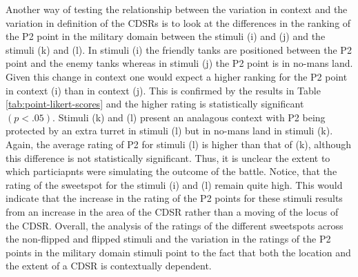 \documentclass[11pt,letterpaper]{article}
\begin{document}

Another way of testing the relationship between the variation in context and the variation in definition of the CDSRs is to look at the differences in the ranking of the P2 point in the military domain between the stimuli (i) and (j) and the stimuli (k) and (l). In stimuli (i) the friendly tanks are positioned between the P2 point and the enemy tanks whereas in stimuli (j) the P2 point is in no-mans land. Given this change in context one would expect a higher ranking for the P2 point in context (i) than in context (j). This is confirmed by the results in Table \ref{tab:point-likert-scores} and the higher rating is statistically significant $(p<.05)$. Stimuli (k) and (l) present an analagous context with P2 being protected by an extra turret in stimuli (l) but in no-mans land in stimuli (k). Again, the average rating of P2 for stimuli (l) is higher than that of (k), although this difference is not statistically significant. Thus, it is unclear the extent to which particiapnts were simulating the outcome of the battle. Notice, that the rating of the sweetspot for the stimuli (i) and (l) remain quite high. This would indicate that the increase in the rating of the P2 points for these stimuli results from an increase in the area of the CDSR rather than a moving of the locus of the CDSR. Overall, the analysis of the ratings of the different sweetspots across the non-flipped and flipped stimuli and the variation in the ratings of the P2 points in the military domain stimuli point to the fact that both the location and the extent of a CDSR is contextually dependent.


\end{document}
